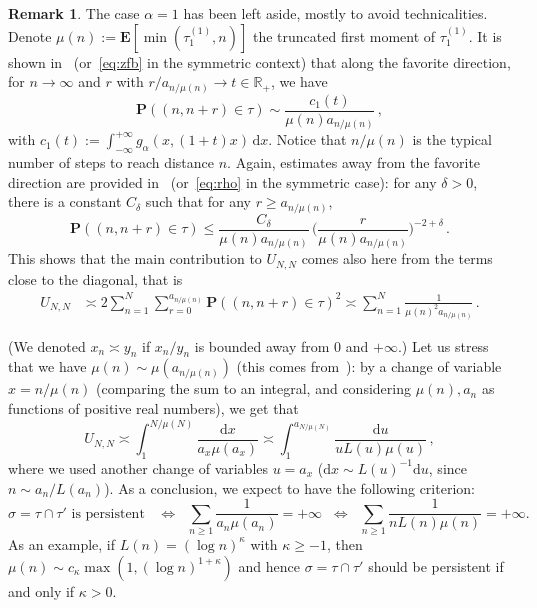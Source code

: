\documentclass[10pt]{amsart}
\theoremstyle{definition}\newtheorem{defi}[theo]{Definition}\newtheorem{rema}[theo]{Remark}\newtheorem{exam}[theo]{Example}\newtheorem{exem}[theo]{Example}\newtheorem{nota}[theo]{Notation}
\newcommand{\ga}{\alpha}
\newcommand{\gd}{\delta}
\newcommand{\dd}{\mathrm{d}}
\newcommand{\bP}{\ensuremath{\mathbf{P}}}
\newcommand{\bE}{\ensuremath{\mathbf{E}}}
\newcommand{\bbR}{\ensuremath{\mathbb{R}}}
\begin{document}
\begin{appendix}
\begin{rema}\label{rem:alpha=1}
The case $\ga=1$ has been left aside, mostly to avoid technicalities. Denote $\mu(n):=\bE[\min(\tau_1^{(1)}, n)]$ the truncated first moment of $\tau_1^{(1)}$. It is shown in~\cite[Theorem~3.4]{cf:B} (or~\eqref{eq:zfb} in the symmetric context) that along the favorite direction, for $n\to \infty$ and $r$ with $r/a_{n/\mu(n)} \to t\in \bbR_+$, we have
\begin{equation}\label{alpha=1}
\bP((n,n+r)\in\tau) \sim \frac{c_1(t)}{\mu(n) a_{n/\mu(n)}}\,,
\end{equation}
with $c_1(t):= \int_{-\infty}^{+\infty} g_{\alpha}(x,(1+t)x)\, \dd x$. Notice that $n/\mu(n)$ is the typical number of steps to reach distance $n$. Again, estimates away from the favorite direction are provided in~\cite[Theorem~4.2]{cf:B} (or~\eqref{eq:rho} in the symmetric case): for any $\gd>0$, there is a constant $C_{\gd}$ such that for any $r \ge a_{n/\mu(n)}$,
\begin{equation}\label{alpha=1away}
\bP((n,n+r)\in\tau) \le \frac{C_{\gd}}{\mu(n) a_{n/\mu(n)}}\,\Big(\frac{r}{\mu(n) a_{n/\mu(n)}} \Big)^{-2+\gd}\,.
\end{equation}
This shows that the main contribution to $U_{N,N}$ comes also here from the terms close to the diagonal, that is
\begin{align*}
U_{N,N} &\asymp 2\sum_{n=1}^N \sum_{r=0}^{a_{n/\mu(n)}} \bP((n,n+r)\in\tau)^2 \asymp \sum_{n=1}^N \frac{1}{\mu(n)^2 a_{n/\mu(n)}}\,.
\end{align*}

(We denoted $x_n\asymp y_n$ if $x_n/y_n$ is bounded away from $0$ and $+\infty$.) Let us stress that we have $\mu(n) \sim \mu(a_{n/\mu(n)})$ (this comes from~\cite[Lemma~4.3]{cf:B17}): by a change of variable $x= n/\mu(n)$ (comparing the sum to an integral, and considering $\mu(n),a_n$ as functions of positive real numbers), we get that
\[
U_{N,N}\asymp \int_{1}^{N/\mu(N)} \frac{\dd x}{ a_{x} \mu(a_x)} \asymp \int_1^{a_{N/\mu(N)}} \frac{\dd u}{u L(u) \mu(u)}\,,
\]
where we used another change of variables $u \!=\!a_x$ ($\dd x \!\sim\! L(u)^{-1}\dd u$, since $n\!\sim\! a_n/L(a_n)$). As a conclusion, we expect to have the following criterion:
\[
\sigma=\tau\cap \tau' \text{ is persistent } \;\; \Longleftrightarrow \;\; \sum_{n\geq 1} \frac{1}{a_n \mu(a_n)} =+\infty \;\; \Longleftrightarrow \;\; \sum_{n\geq 1} \frac{1}{n L(n)\mu(n)} =+\infty.
\]
As an example, if $L(n) =(\log n)^{\kappa}$ with $\kappa \geq -1$, then $\mu(n) \sim c_{\kappa} \max(1, (\log n)^{1+\kappa})$ and hence $\sigma=\tau\cap \tau'$ should be persistent if and only if $\kappa>0$.
\end{rema}
\end{appendix}
\end{document}
